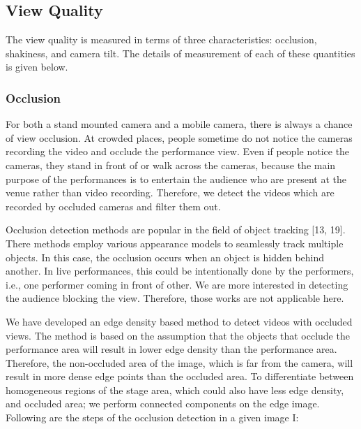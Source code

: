 \documentclass{sig-alternate-05-2015}
\begin{document}
\subsection{View Quality}
The view quality is measured in terms of three characteristics:
occlusion, shakiness, and camera tilt. The details of measurement
of each of these quantities is given below.
\subsubsection{Occlusion}
For both a stand mounted camera and a mobile camera, there
is always a chance of view occlusion. At crowded places, people
sometime do not notice the cameras recording the video and occlude the performance view. Even if people notice the cameras,
they stand in front of or walk across the cameras, because the main
purpose of the performances is to entertain the audience who are
present at the venue rather than video recording. Therefore, we detect the videos which are recorded by occluded cameras and filter
them out.\par
Occlusion detection methods are popular in the field of object
tracking [13, 19]. There methods employ various appearance models to seamlessly track multiple objects. In this case, the occlusion
occurs when an object is hidden behind another. In live performances, this could be intentionally done by the performers, i.e.,
one performer coming in front of other. We are more interested in
detecting the audience blocking the view. Therefore, those works
are not applicable here.\par
We have developed an edge density based method to detect videos
with occluded views. The method is based on the assumption that
the objects that occlude the performance area will result in lower
edge density than the performance area. Therefore, the non-occluded
area of the image, which is far from the camera, will result in more
dense edge points than the occluded area. To differentiate between
homogeneous regions of the stage area, which could also have less edge density, and occluded area; we perform connected components on the edge image. Following are the steps of the occlusion
detection in a given image I:
\end{document}

